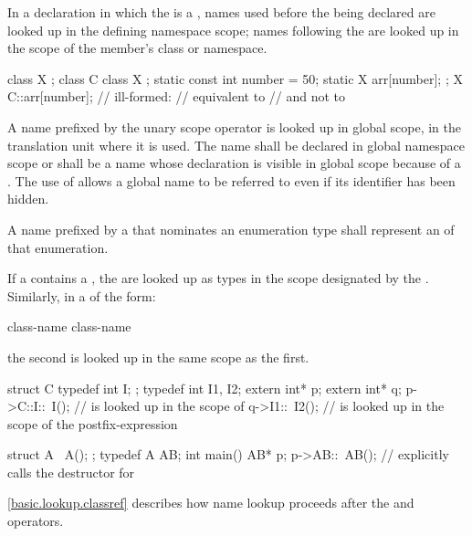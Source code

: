 \pnum
In a declaration in which the  is a
, names used before the 
being declared are looked up in the defining namespace scope; names
following the  are looked up in the scope of the
member's class or namespace. \begin{example}

\begin{codeblock}
class X { };
class C {
  class X { };
  static const int number = 50;
  static X arr[number];
};
X C::arr[number];   // ill-formed:
                    // equivalent to  
                    // and not to  
\end{codeblock}
\end{example}

\pnum
{}%
%
A name prefixed by the unary scope operator \tcode{::}
is looked up in global scope, in the translation unit where it is used.
The name shall be declared in global namespace scope or shall be a name
whose declaration is visible in global scope because of a
. The use of \tcode{::}
allows a global name to be referred to even if its identifier has been
hidden.

\pnum
A name prefixed by a  that
nominates an enumeration type shall represent an 
of that enumeration.

\pnum
If a  contains a
, the  are looked
up as types in the scope designated by the
. Similarly, in a
 of the form:

\begin{ncbnf}
 class-name \terminal{::} \terminal{\~} class-name
\end{ncbnf}

the second  is looked up in the same scope as the
first. \begin{example}

\begin{codeblock}
struct C {
  typedef int I;
};
typedef int I1, I2;
extern int* p;
extern int* q;
p->C::I::~I();      //  is looked up in the scope of 
q->I1::~I2();       //  is looked up in the scope of the postfix-expression

struct A {
  ~A();
};
typedef A AB;
int main() {
  AB* p;
  p->AB::~AB();     // explicitly calls the destructor for 
}
\end{codeblock}
\end{example} \begin{note} \ref{basic.lookup.classref} describes how name
lookup proceeds after the  and \tcode{->} operators. \end{note}

